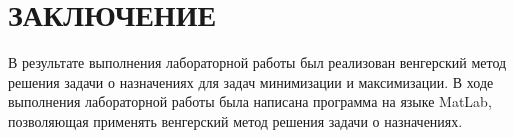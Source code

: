




\chapter*{ЗАКЛЮЧЕНИЕ}

В результате выполнения лабораторной работы был реализован венгерский метод решения задачи о назначениях для задач минимизации и максимизации. В ходе выполнения лабораторной работы была написана
программа на языке MatLab, позволяющая применять венгерский метод решения задачи о назначениях.